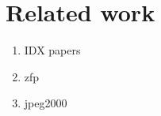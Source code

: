 \section{Related work}
\begin{enumerate}
  \item IDX papers
  \item zfp
  \item jpeg2000
\end{enumerate}
